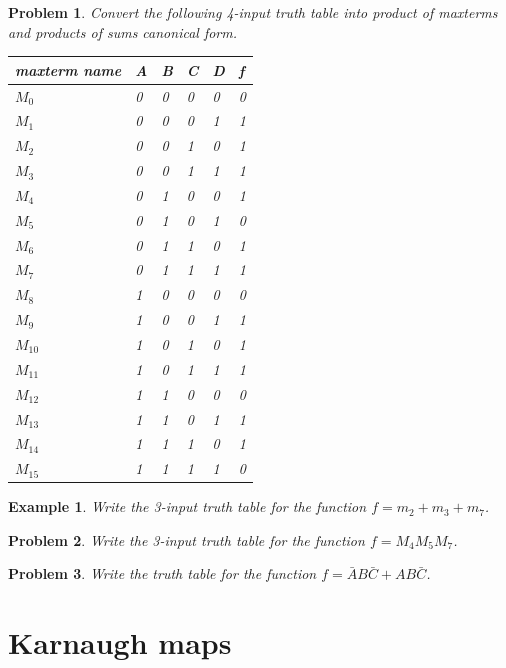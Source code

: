 \documentclass{article}
\newtheorem{example}{Example}
\newtheorem{prob}{Problem}
\begin{document}
\begin{prob}
  Convert the following 4-input truth table into product of maxterms and products of sums canonical form.

  \noindent
  \begin{tabular}{p{20mm}llll|l}
    \toprule
    maxterm name & A & B & C & D & f \\
    \midrule
    $M_0$ & 0 & 0 & 0 & 0 & 0 \\ 
    $M_1$ & 0 & 0 & 0 & 1 & 1 \\ 
    $M_2$ & 0 & 0 & 1 & 0 & 1 \\ 
    $M_3$ & 0 & 0 & 1 & 1 & 1 \\ 
    $M_4$ & 0 & 1 & 0 & 0 & 1 \\ 
    $M_5$ & 0 & 1 & 0 & 1 & 0 \\ 
    $M_6$ & 0 & 1 & 1 & 0 & 1 \\ 
    $M_7$ & 0 & 1 & 1 & 1 & 1 \\ 
    $M_8$ & 1 & 0 & 0 & 0 & 0 \\ 
    $M_9$ & 1 & 0 & 0 & 1 & 1 \\ 
    $M_{10}$ & 1 & 0 & 1 & 0 & 1 \\
    $M_{11}$ & 1 & 0 & 1 & 1 & 1 \\
    $M_{12}$ & 1 & 1 & 0 & 0 & 0 \\
    $M_{13}$ & 1 & 1 & 0 & 1 & 1 \\
    $M_{14}$ & 1 & 1 & 1 & 0 & 1 \\
    $M_{15}$ & 1 & 1 & 1 & 1 & 0 \\
    \bottomrule
  \end{tabular}
\end{prob}

\begin{example}
  Write the 3-input truth table for the function $f = m_2 + m_3 + m_7$.
\end{example}
\vspace{10em}

\begin{prob}
  Write the 3-input truth table for the function $f = M_4M_5M_7$. 
\end{prob}

\begin{prob}
  Write the truth table for the function $f = \bar{A}B\bar{C} + AB\bar{C}$. 
\end{prob}

\section{Karnaugh maps}
\end{document}
